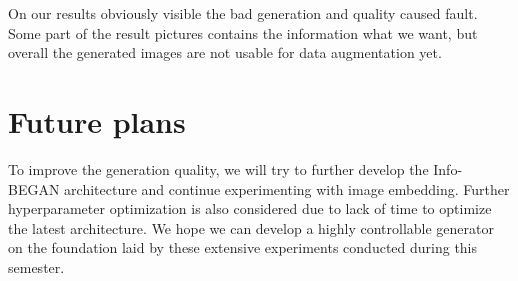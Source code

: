 \documentclass{egpubl}
\begin{document}
On our results obviously visible the bad generation and quality caused fault. Some part of the result pictures contains the information what we want, but overall the generated images are not usable for data augmentation yet.

\section{Future plans}
To improve the generation quality, we will try to further develop the Info-BEGAN architecture and continue experimenting with image embedding. Further hyperparameter optimization is also considered due to lack of time to optimize the latest architecture. We hope we can develop a highly controllable generator on the foundation laid by these extensive experiments conducted during this semester.
\end{document}

